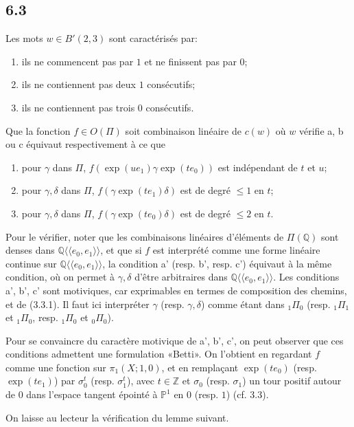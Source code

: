 \documentclass[10pt]{article}
\newcommand{\Q}{\mathbb Q}
\newcommand{\Z}{\mathbb Z}
\newcommand{\PP}{\mathbb P}
\begin{document}
\subsection*{6.3}
Les mots $w\in B'(2,3)$ sont caractérisés par:
\begin{enumerate}[label=\alph*.]
\item ils ne commencent pas par $1$ et ne finissent pas par $0$;
\item ils ne contiennent pas deux $1$ consécutifs;
\item ils ne contiennent pas trois $0$ consécutifs.
\end{enumerate}
Que la fonction $f\in O(\Pi)$ soit combinaison linéaire de $c(w)$ où $w$ vérifie a, b ou c équivaut respectivement à ce que
\begin{enumerate}[label=\alph*'.]
\item pour $\gamma$ dans $\Pi$, $f(\exp(ue_1)\gamma\exp(te_0))$ est indépendant de $t$ et $u$;
\item pour $\gamma,\delta$ dans $\Pi$, $f(\gamma\exp(te_1)\delta)$ est de degré $\leq1$ en $t$;
\item pour $\gamma,\delta$ dans $\Pi$, $f(\gamma\exp(te_0)\delta)$ est de degré $\leq2$ en $t$.
\end{enumerate}
Pour le vérifier, noter que les combinaisons linéaires d'éléments de $\Pi(\Q)$ sont denses dans $\Q\langle\!\langle e_0,e_1\rangle\!\rangle$, et que si $f$ est interprété comme une forme linéaire continue sur $\Q\langle\!\langle e_0,e_1\rangle\!\rangle$, la condition a' (resp. b', resp. c') équivaut à la même condition, où on permet à $\gamma,\delta$ d'être arbitraires dans $\Q\langle\!\langle e_0,e_1\rangle\!\rangle$. Les conditions a', b', c' sont motiviques, car exprimables en termes de composition des chemins, et de (3.3.1). Il faut ici interpréter $\gamma$ (resp. $\gamma,\delta$) comme étant dans ${}_1\Pi_0$ (resp. ${}_1\Pi_1$ et ${}_1\Pi_0$, resp. ${}_1\Pi_0$ et ${}_0\Pi_0$).

Pour se convaincre du caractère motivique de a', b', c', on peut observer que ces conditions admettent une formulation «Betti». On l'obtient en regardant $f$ comme une fonction sur $\pi_1(X;1,0)$, et en remplaçant $\exp(te_0)$ (resp. $\exp(te_1)$) par $\sigma_0^t$ (resp. $\sigma_1^t$), avec $t\in\Z$ et $\sigma_0$ (resp. $\sigma_1$) un tour positif autour de $0$ dans l'espace tangent épointé à $\PP^1$ en $0$ (resp. $1$) (cf. 3.3).

On laisse au lecteur la vérification du lemme suivant.
\end{document}

